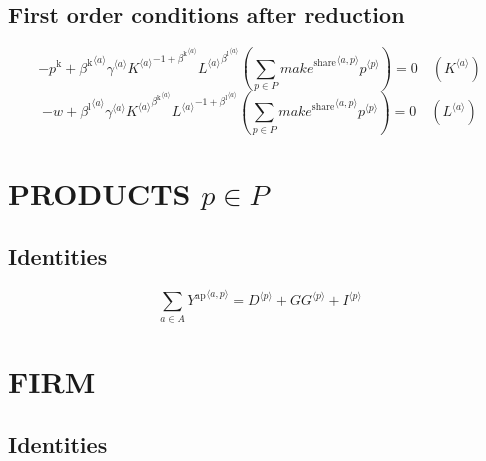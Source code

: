 \subsection{First order conditions after reduction}

\begin{equation}
-p^{\mathrm{k}} + {{\beta^{\mathrm{k}}}^{\langle a\rangle}} {{\gamma}^{\langle a\rangle}} {{{K}^{\langle a\rangle}}^{-1 + {\beta^{\mathrm{k}}}^{\langle a\rangle}}} {{{L}^{\langle a\rangle}}^{{\beta^{\mathrm{l}}}^{\langle a\rangle}}} \left(\sum_{p\in P} {{{m\!a\!k\!e}^{\mathrm{share}}}^{\langle a,p\rangle}} {{p}^{\langle p\rangle}}\right) = 0
 \quad \left({K}^{\langle a\rangle}\right)
\end{equation}
\begin{equation}
-w + {{\beta^{\mathrm{l}}}^{\langle a\rangle}} {{\gamma}^{\langle a\rangle}} {{{K}^{\langle a\rangle}}^{{\beta^{\mathrm{k}}}^{\langle a\rangle}}} {{{L}^{\langle a\rangle}}^{-1 + {\beta^{\mathrm{l}}}^{\langle a\rangle}}} \left(\sum_{p\in P} {{{m\!a\!k\!e}^{\mathrm{share}}}^{\langle a,p\rangle}} {{p}^{\langle p\rangle}}\right) = 0
 \quad \left({L}^{\langle a\rangle}\right)
\end{equation}




\section{PRODUCTS $p\in P$}

\subsection{Identities}

\begin{equation}
\sum_{a\in A} {Y^{\mathrm{ap}}}^{\langle a,p\rangle} = {D}^{\langle p\rangle} + {{G\!G}}^{\langle p\rangle} + {I}^{\langle p\rangle}
\end{equation}




\section{FIRM}

\subsection{Identities}

